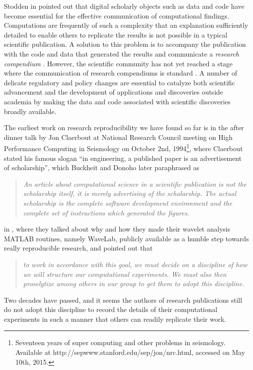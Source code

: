 Stodden in \cite{stodden2014enabling} pointed out that digital scholarly objects such as data and code have become essential for the effective communication of computational findings. Computations are frequently of such a complexity that an explanation sufficiently detailed to enable others to replicate the results is not possible in a typical scientific publication. A solution to this problem is to accompany the publication with the code and data that generated the results and communicate a \emph{research compendium} \cite{gentleman2007statistical}. However, the scientific community has not yet reached a stage where the communication of research compendiums is standard \cite{donoho2009reproducible}. A number of delicate regulatory and policy changes are essential to catalyze both scientific advancement and the development of applications and discoveries outside academia by making the data and code associated with scientific discoveries broadly available.


The earliest work on research reproducibility we have found so far is in the after dinner talk by Jon Claerbout at National Research Council meeting on High Performance Computing in Seismology on October 2nd, 1994\footnote{Seventeen years of super computing and other problems in seismology. Available at http://sepwww.stanford.edu/sep/jon/nrc.html, accessed on May 10th, 2015.}, where Claerbout stated his famous slogan ``in engineering, a published paper is an advertisement of scholarship'', which Buckheit and Donoho later paraphrased as 
\begin{quote}\emph{
	An article about computational science in a scientific publication is \emph{not} the
	scholarship itself, it is merely \emph{advertising} of the scholarship. The actual scholarship is the 
	complete software development environment and the complete set
	of instructions which generated the figures.}
\end{quote}
in \cite{buckheit1995wavelab}, where they talked about why and how they
made their wavelet analysis MATLAB routines, namely WaveLab, publicly available as a humble step towards really reproducible research, and pointed out that
\begin{quote}\emph{
	to work in accordance with this goal, we must decide on a discipline
	of how we will structure our computational experiments. We must also then proselytize
	among others in our group to get them to adopt this discipline.}
\end{quote}
Two decades have passed, and it seems the authors of research publications still do not adopt this discipline to record the details of their computational experiments in such a manner that others can readily replicate their work.

